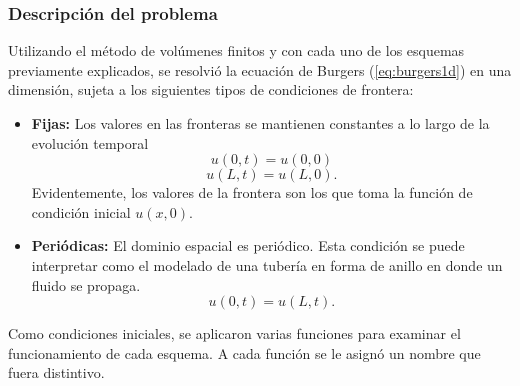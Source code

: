 \documentclass[12pt]{article}
\begin{document}
	\subsubsection{Descripción del problema}
	Utilizando el método de volúmenes finitos y con cada uno de los esquemas previamente explicados, se resolvió la ecuación de Burgers (\ref{eq:burgers1d}) en una dimensión, sujeta a los siguientes tipos de condiciones de frontera:
	\begin{itemize}
		\item \textbf{Fijas:} Los valores en las fronteras se mantienen constantes a lo largo de la evolución temporal
		\begin{equation}
			u(0,t) = u(0,0)
		\end{equation}
		\begin{equation}
			u(L, t) = u(L, 0).
		\end{equation}
		Evidentemente, los valores de la frontera son los que toma la función de condición inicial $u(x,0)$.
		\item \textbf{Periódicas:} El dominio espacial es periódico. Esta condición se puede interpretar como el modelado de una tubería en forma de anillo en donde un fluido se propaga.
		\begin{equation}
			u(0,t) = u(L, t).
		\end{equation}
	\end{itemize}
	Como condiciones iniciales, se aplicaron varias funciones para examinar el funcionamiento de cada esquema. A cada función se le asignó un nombre que fuera distintivo.
\end{document}
